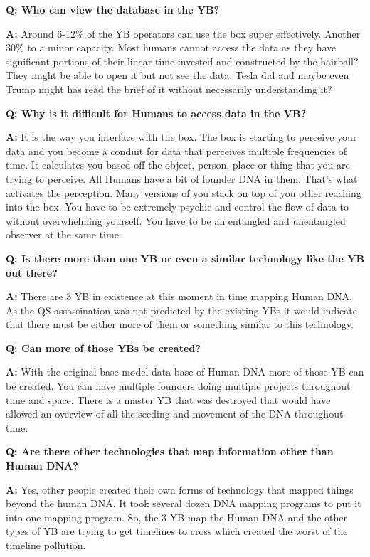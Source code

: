 \textbf{Q: Who can view the database in the YB?}

\textbf{A:} Around 6-12\% of the YB operators can use the box super
effectively. Another 30\% to a minor capacity. Most humans cannot access
the data as they have significant portions of their linear time invested
and constructed by the hairball? They might be able to open it but not
see the data. Tesla did and maybe even Trump might has read the brief of
it without necessarily understanding it?

\textbf{Q: Why is it difficult for Humans to access data in the VB?}

\textbf{A:} It is the way you interface with the box. The box is
starting to perceive your data and you become a conduit for data that
perceives multiple frequencies of time. It calculates you based off the
object, person, place or thing that you are trying to perceive. All
Humans have a bit of founder DNA in them. That's what activates the
perception. Many versions of you stack on top of you other reaching into
the box. You have to be extremely psychic and control the flow of data
to without overwhelming yourself. You have to be an entangled and
unentangled observer at the same time.

\textbf{Q: Is there more than one YB or even a similar technology like
the YB out there?}

\textbf{A:} There are 3 YB in existence at this moment in time mapping
Human DNA. As the QS assassination was not predicted by the existing YBs
it would indicate that there must be either more of them or something
similar to this technology.

\textbf{Q: Can more of those YBs be created?}

\textbf{A:} With the original base model data base of Human DNA more of
those YB can be created. You can have multiple founders doing multiple
projects throughout time and space. There is a master YB that was
destroyed that would have allowed an overview of all the seeding and
movement of the DNA throughout time.

\textbf{Q: Are there other technologies that map information other than
Human DNA?}

\textbf{A:} Yes, other people created their own forms of technology that
mapped things beyond the human DNA. It took several dozen DNA mapping
programs to put it into one mapping program. So, the 3 YB map the Human
DNA and the other types of YB are trying to get timelines to cross which
created the worst of the timeline pollution.

